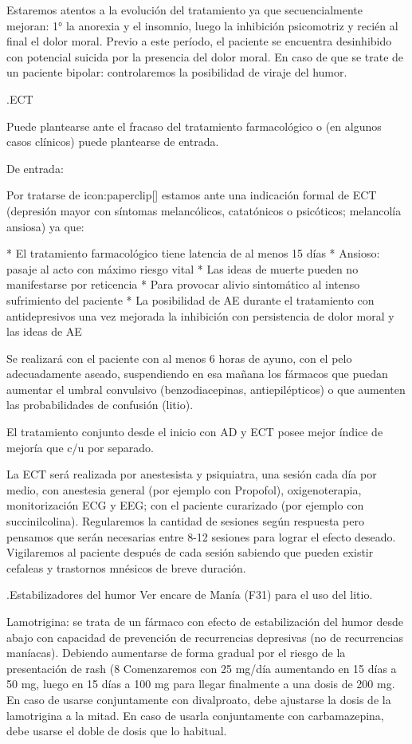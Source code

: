 Estaremos atentos a la evolución del tratamiento ya que secuencialmente mejoran: 1° la anorexia y el insomnio, luego la inhibición psicomotriz y recién al final el dolor moral. Previo a este período, el paciente se encuentra desinhibido con potencial suicida por la presencia del dolor moral. En caso de que se trate de un paciente bipolar: controlaremos la posibilidad de viraje del humor.

.ECT

Puede plantearse ante el fracaso del tratamiento farmacológico o (en algunos casos clínicos) puede plantearse de entrada.

De entrada:

Por tratarse de icon:paperclip[] estamos ante una indicación formal de ECT (depresión mayor con síntomas melancólicos, catatónicos o psicóticos; melancolía ansiosa) ya que:

* El tratamiento farmacológico tiene latencia de al menos 15 días
* Ansioso: pasaje al acto con máximo riesgo vital
* Las ideas de muerte pueden no manifestarse por reticencia
* Para provocar alivio sintomático al intenso sufrimiento del paciente
* La posibilidad de AE durante el tratamiento con antidepresivos una vez mejorada la inhibición con persistencia de dolor moral y las ideas de AE

Se realizará con el paciente con al menos 6 horas de ayuno, con el pelo adecuadamente aseado, suspendiendo en esa mañana los fármacos que puedan aumentar el umbral convulsivo (benzodiacepinas, antiepilépticos) o que aumenten las probabilidades de confusión (litio).

El tratamiento conjunto desde el inicio con AD y ECT posee mejor índice de mejoría que c/u por separado.

La ECT será realizada por anestesista y psiquiatra, una sesión cada día por medio, con anestesia general (por ejemplo con Propofol), oxigenoterapia, monitorización ECG y EEG; con el paciente curarizado (por ejemplo con succinilcolina). Regularemos la cantidad de sesiones según respuesta pero pensamos que serán necesarias entre 8-12 sesiones para lograr el efecto deseado. Vigilaremos al paciente después de cada sesión sabiendo que pueden existir cefaleas y trastornos mnésicos de breve duración.

.Estabilizadores del humor
Ver encare de Manía (F31) para el uso del litio.

Lamotrigina: se trata de un fármaco con efecto de estabilización del humor desde abajo con capacidad de prevención de recurrencias depresivas (no de recurrencias maníacas). Debiendo aumentarse de forma gradual por el riesgo de la presentación de rash (8%
Comenzaremos con 25 mg/día aumentando en 15 días a 50 mg, luego en 15 días a 100 mg para llegar finalmente a una dosis de 200 mg. En caso de usarse conjuntamente con divalproato, debe ajustarse la dosis de la lamotrigina a la mitad. En caso de usarla conjuntamente con carbamazepina, debe usarse el doble de dosis que lo habitual.

